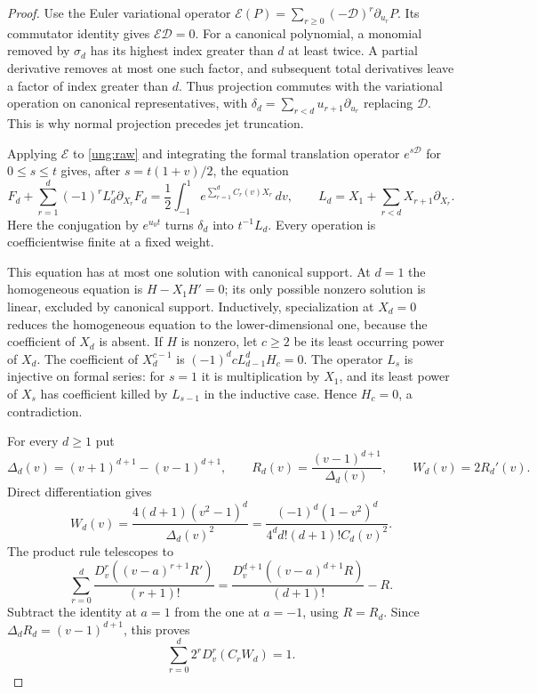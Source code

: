 \begin{proof}
Use the Euler variational operator
$\mathcal E(P)=\sum_{r\ge0}(-\mathcal D)^r\partial_{u_r}P$.
Its commutator identity gives $\mathcal E\mathcal D=0$.
For a canonical polynomial, a monomial removed by $\sigma_d$ has
its highest index greater than $d$ at least twice. A partial derivative
removes at most one such factor, and subsequent total derivatives
leave a factor of index greater than $d$. Thus projection commutes with
the variational operation on canonical representatives, with
$\delta_d=\sum_{r<d}u_{r+1}\partial_{u_r}$ replacing $\mathcal D$.
This is why normal projection precedes jet truncation.

Applying $\mathcal E$ to \eqref{ung:raw} and integrating the formal
translation operator $e^{s\mathcal D}$ for $0\le s\le t$ gives,
after $s=t(1+v)/2$, the equation
\begin{equation}\label{ung:Euler-equation}
 F_d+\sum_{r=1}^d(-1)^r L_d^r\partial_{X_r}F_d
 =\frac12\int_{-1}^1e^{\sum_{r=1}^d C_r(v)X_r}\,dv,
 \qquad L_d=X_1+\sum_{r<d}X_{r+1}\partial_{X_r}.
\end{equation}
Here the conjugation by $e^{u_0t}$ turns $\delta_d$ into $t^{-1}L_d$.
Every operation is coefficientwise finite at a fixed weight.

This equation has at most one solution with canonical support. At
$d=1$ the homogeneous equation is $H-X_1H'=0$; its only possible
nonzero solution is linear, excluded by canonical support. Inductively,
specialization at $X_d=0$ reduces the homogeneous equation to the
lower-dimensional one, because the coefficient of $X_d$ is absent.
If $H$ is nonzero, let $c\ge2$ be its least occurring power of $X_d$.
The coefficient of $X_d^{c-1}$ is
$(-1)^d cL_{d-1}^dH_c=0$.
The operator $L_s$ is injective on formal series: for $s=1$ it is
multiplication by $X_1$, and its least power of $X_s$ has coefficient
killed by $L_{s-1}$ in the inductive case. Hence $H_c=0$, a contradiction.

For every $d\ge1$ put
\[
 \Delta_d(v)=(v+1)^{d+1}-(v-1)^{d+1},\qquad
 R_d(v)=\frac{(v-1)^{d+1}}{\Delta_d(v)},\qquad W_d(v)=2R_d'(v).
\]
Direct differentiation gives
\begin{equation}\label{ung:W}
 W_d(v)=\frac{4(d+1)(v^2-1)^d}{\Delta_d(v)^2}
       =\frac{(-1)^d(1-v^2)^d}{4^d d!(d+1)!C_d(v)^2}.
\end{equation}
The product rule telescopes to
\[
 \sum_{r=0}^d\frac{D_v^r((v-a)^{r+1}R')}{(r+1)!}
 =\frac{D_v^{d+1}((v-a)^{d+1}R)}{(d+1)!}-R.
\]
Subtract the identity at $a=1$ from the one at $a=-1$, using
$R=R_d$. Since $\Delta_dR_d=(v-1)^{d+1}$, this proves
\begin{equation}\label{ung:adjoint}
                    \sum_{r=0}^d2^rD_v^r(C_rW_d)=1.
\end{equation}


\end{proof}
